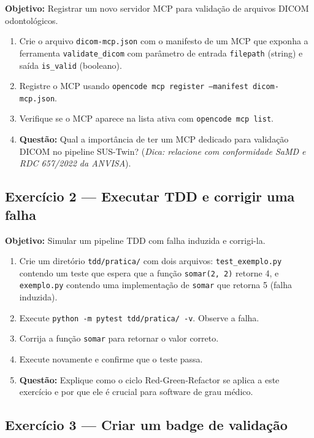 \textbf{Objetivo:} Registrar um novo servidor MCP para validação de arquivos
DICOM odontológicos.

\begin{enumerate}
  \item Crie o arquivo \texttt{dicom-mcp.json} com o manifesto de um MCP que
        exponha a ferramenta \texttt{validate\_dicom} com parâmetro de entrada
        \texttt{filepath} (string) e saída \texttt{is\_valid} (booleano).
  \item Registre o MCP usando \texttt{opencode mcp register --manifest
        dicom-mcp.json}.
  \item Verifique se o MCP aparece na lista ativa com
        \texttt{opencode mcp list}.
  \item \textbf{Questão:} Qual a importância de ter um MCP dedicado para
        validação DICOM no pipeline SUS-Twin? (\textit{Dica: relacione com
        conformidade SaMD e RDC 657/2022 da ANVISA}).
\end{enumerate}

\subsection*{Exercício 2 — Executar TDD e corrigir uma falha}

\textbf{Objetivo:} Simular um pipeline TDD com falha induzida e corrigi-la.

\begin{enumerate}
  \item Crie um diretório \texttt{tdd/pratica/} com dois arquivos:
        \texttt{test\_exemplo.py} contendo um teste que espera que a função
        \texttt{somar(2, 2)} retorne 4, e \texttt{exemplo.py} contendo uma
        implementação de \texttt{somar} que retorna 5 (falha induzida).
  \item Execute \texttt{python -m pytest tdd/pratica/ -v}. Observe a falha.
  \item Corrija a função \texttt{somar} para retornar o valor correto.
  \item Execute novamente e confirme que o teste passa.
  \item \textbf{Questão:} Explique como o ciclo Red-Green-Refactor se aplica
        a este exercício e por que ele é crucial para software de grau médico.
\end{enumerate}

\subsection*{Exercício 3 — Criar um badge de validação}

